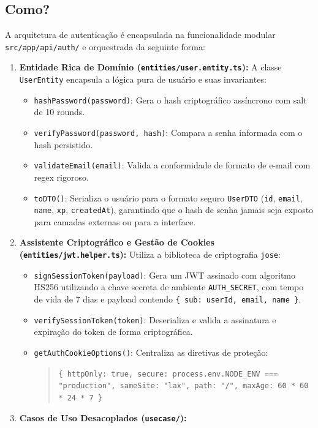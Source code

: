\documentclass[12pt,a4paper]{article}
\begin{document}
\subsection{Como?}
A arquitetura de autenticação é encapsulada na funcionalidade modular \texttt{src/app/api/auth/} e orquestrada da seguinte forma:
\begin{enumerate}
  \item \textbf{Entidade Rica de Domínio (\texttt{entities/user.entity.ts}):}
  A classe \texttt{UserEntity} encapsula a lógica pura de usuário e suas invariantes:
  \begin{itemize}
    \item \texttt{hashPassword(password)}: Gera o hash criptográfico assíncrono com salt de 10 rounds.
    \item \texttt{verifyPassword(password, hash)}: Compara a senha informada com o hash persistido.
    \item \texttt{validateEmail(email)}: Valida a conformidade de formato de e-mail com regex rigoroso.
    \item \texttt{toDTO()}: Serializa o usuário para o formato seguro \texttt{UserDTO} (\texttt{id}, \texttt{email}, \texttt{name}, \texttt{xp}, \texttt{createdAt}), garantindo que o hash de senha jamais seja exposto para camadas externas ou para a interface.
  \end{itemize}
  \item \textbf{Assistente Criptográfico e Gestão de Cookies (\texttt{entities/jwt.helper.ts}):}
  Utiliza a biblioteca de criptografia \texttt{jose}:
  \begin{itemize}
    \item \texttt{signSessionToken(payload)}: Gera um JWT assinado com algoritmo HS256 utilizando a chave secreta de ambiente \texttt{AUTH\_SECRET}, com tempo de vida de 7 dias e payload contendo \texttt{\{ sub: userId, email, name \}}.
    \item \texttt{verifySessionToken(token)}: Deserializa e valida a assinatura e expiração do token de forma criptográfica.
    \item \texttt{getAuthCookieOptions()}: Centraliza as diretivas de proteção:
    \begin{quote}
      \texttt{\{ httpOnly: true, secure: process.env.NODE\_ENV === "production", sameSite: "lax", path: "/", maxAge: 60 * 60 * 24 * 7 \}}
    \end{quote}
  \end{itemize}
  \item \textbf{Casos de Uso Desacoplados (\texttt{usecase/}):}

\end{enumerate}
\end{document}
